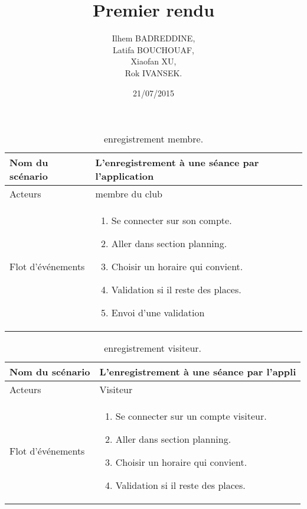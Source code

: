 \documentclass{report}
\title{Premier rendu }
\author{Ilhem BADREDDINE,\\ Latifa BOUCHOUAF, \\ Xiaofan XU, \\ Rok IVANSEK.}
\date{21/07/2015}
\begin{document}
\begin{table}[htbp]
\begin{center}
\begin{tabular}{|L{4cm}||L{10cm}|}
\hline Nom du scénario & L'enregistrement à une séance par l'application    \\
\hline  Acteurs &  membre du club \\
\hline  Flot d'événements &  \begin{enumerate}
\item Se connecter sur son compte.
\item Aller dans section planning.
\item Choisir un horaire qui convient.
\item Validation si il reste des places.
\item Envoi d'une validation
\end{enumerate} \\
\hline
\end{tabular}
\caption{enregistrement membre.\label{engmembre}}
\end{center}
\end{table}

\begin{table}[htbp]
\begin{center}
\begin{tabular}{|L{4cm}||L{10cm}|}
\hline Nom du scénario & L'enregistrement à une séance par l'appli    \\
\hline  Acteurs &  Visiteur \\
\hline  Flot d'événements &  \begin{enumerate}
\item Se connecter sur un compte visiteur.
\item Aller dans section planning.
\item Choisir un horaire qui convient.
\item Validation si il reste des places.
\end{enumerate}\\
\hline
\end{tabular}
\caption{enregistrement visiteur.\label{engvisit}}
\end{center}
\end{table}
\end{document}

